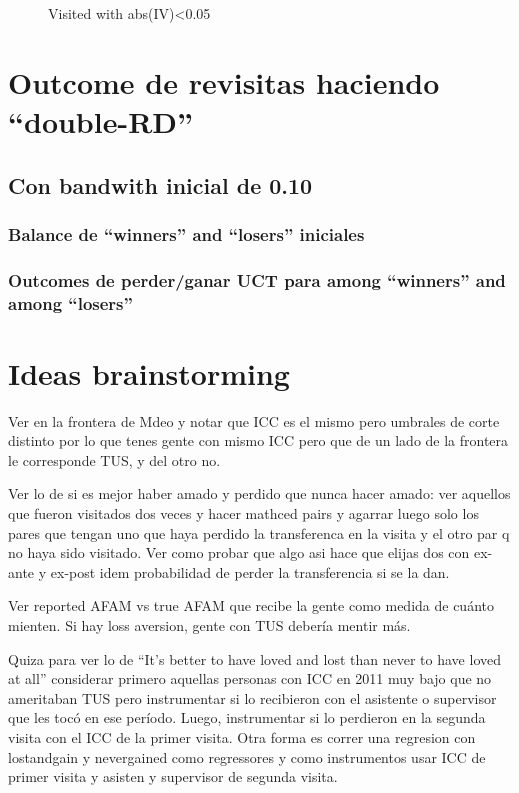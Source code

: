 \documentclass[12pt]{article}
\begin{document}
\begin{figure}[H]
	\caption{Visited with abs(IV)<0.05}
	
	\centering
	\label{fig:balSinConTusPrimVisita005}
\end{figure}

\section{Outcome de revisitas haciendo ``double-RD''}

\subsection{Con bandwith inicial de 0.10}

\subsubsection{Balance de ``winners'' and ``losers'' iniciales}

\subsubsection{Outcomes de perder/ganar UCT para among ``winners'' and among ``losers''}

\section{Ideas brainstorming}
Ver en la frontera de Mdeo y notar que ICC es el mismo pero umbrales de corte distinto por lo que tenes gente con mismo ICC pero que de un lado de la frontera le corresponde TUS, y del otro no.

Ver lo de si es mejor haber amado y perdido que nunca hacer amado: ver aquellos que fueron visitados dos veces y hacer mathced pairs y agarrar luego solo los pares que tengan uno que haya perdido la transferenca en la visita y el otro par q no haya sido visitado. Ver como probar que algo asi hace que elijas dos con ex-ante y ex-post idem probabilidad de perder la transferencia si se la dan.

Ver reported AFAM vs true AFAM que recibe la gente como medida de cuánto mienten. Si hay loss aversion, gente con TUS debería mentir más.

Quiza para ver lo de ``It's better to have loved and lost than never to have loved at all'' considerar primero aquellas personas con ICC en 2011 muy bajo que no ameritaban TUS pero instrumentar si lo recibieron con el asistente o supervisor que les tocó en ese período. Luego, instrumentar si lo perdieron en la segunda visita con el ICC de la primer visita. Otra forma es correr una regresion con lostandgain y nevergained como regressores y como instrumentos usar ICC de primer visita y asisten y supervisor de segunda visita.
\end{document}
